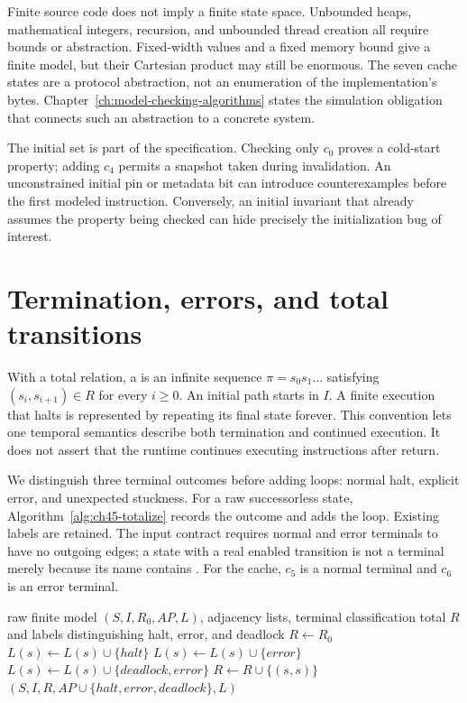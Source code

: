 Finite source code does not imply a finite state space.
Unbounded heaps, mathematical integers, recursion, and unbounded thread creation all require bounds or abstraction.
Fixed-width values and a fixed memory bound give a finite model, but their Cartesian product may still be enormous.
The seven cache states are a protocol abstraction, not an enumeration of the implementation's bytes.
Chapter~\ref{ch:model-checking-algorithms} states the simulation obligation that connects such an abstraction to a concrete system.

The initial set is part of the specification.
Checking only $c_0$ proves a cold-start property; adding $c_4$ permits a snapshot taken during invalidation.
An unconstrained initial pin or metadata bit can introduce counterexamples before the first modeled instruction.
Conversely, an initial invariant that already assumes the property being checked can hide precisely the initialization bug of interest.

\section{Termination, errors, and total transitions}
\label{sec:ch45-deadlocks}

With a total relation, a  is an infinite sequence $\pi=s_0s_1\ldots$ satisfying $(s_i,s_{i+1})\in R$ for every $i\geq0$.
An initial path starts in $I$.
A finite execution that halts is represented by repeating its final state forever.
This convention lets one temporal semantics describe both termination and continued execution.
It does not assert that the runtime continues executing instructions after return.

We distinguish three terminal outcomes before adding loops: normal halt, explicit error, and unexpected stuckness.
For a raw successorless state, Algorithm~\ref{alg:ch45-totalize} records the outcome and adds the loop.
Existing labels are retained.
The input contract requires normal and error terminals to have no outgoing edges; a state with a real enabled transition is not a terminal merely because its name contains .
For the cache, $c_5$ is a normal terminal and $c_6$ is an error terminal.

\begin{algorithm}[tbp]
\caption{Totalize a finite model while retaining terminal outcomes.}
\label{alg:ch45-totalize}
\begin{pseudocode}
\Require raw finite model $(S,I,R_0,AP,L)$, adjacency lists, terminal classification
\Ensure total $R$ and labels distinguishing halt, error, and deadlock
\State $R\gets R_0$
      \State $L(s)\gets L(s)\cup\{\mathit{halt}\}$
      \State $L(s)\gets L(s)\cup\{\mathit{error}\}$
    \Else
      \State $L(s)\gets L(s)\cup\{\mathit{deadlock},\mathit{error}\}$
    \EndIf
    \State $R\gets R\cup\{(s,s)\}$
  \EndIf
\EndFor
\State \Return $(S,I,R,AP\cup\{\mathit{halt},\mathit{error},\mathit{deadlock}\},L)$
\end{pseudocode}
\end{algorithm}

